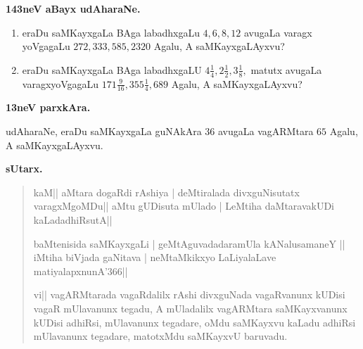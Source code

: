 \begin{center}
{\bf\large 143neV aBayx udAharaNe.}
\end{center}

\begin{enumerate}[\rm(1)]
\item eraDu saMKayxgaLa BAga labadhxgaLu $4, 6, 8, 12$ avugaLa varagx yoVgagaLu $272, 333, 585, 2320$ Agalu, A saMKayxgaLAyxvu?

\item eraDu saMKayxgaLa BAga labadhxgaLU $4\tfrac{1}{4}, 2\tfrac{1}{2}, 3\tfrac{1}{8},$ matutx avugaLa varagxyoVgagaLu $171\tfrac{9}{16}, 355\tfrac{1}{4}, 689$ Agalu, A saMKayxgaLAyxvu?
\end{enumerate}

\begin{center}
{\bf 13neV parxkAra.}
\end{center}

udAharaNe, eraDu saMKayxgaLa guNAkAra $36$ avugaLa vagARMtara $65$ Agalu, A saMKayxgaLAyxvu.

\begin{center}
{\bf\large sUtarx.}
\end{center}

\begin{verse}
kaM|| aMtara dogaRdi rAshiya | deMtiralada divxguNisutatx varagxMgoMDu|| aMtu gUDisuta mUlado | LeMtiha daMtaravakUDi kaLadadhiRsutA||

baMtenisida saMKayxgaLi | geMtAguvadadaramUla kANalusamaneY || iMtiha biVjada gaNitava | neMtaMkikxyo LaLiyalaLave matiyalapxnunA\char'366||

vi|| vagARMtarada vagaRdalilx rAshi divxguNada vagaRvanunx kUDisi vagaR mUlavanunx tegadu, A mUladalilx vagARMtara saMKayxvanunx kUDisi adhiRsi, mUlavanunx tegadare, oMdu saMKayxvu kaLadu adhiRsi mUlavanunx tegadare, matotxMdu saMKayxvU baruvadu.
\end{verse}


